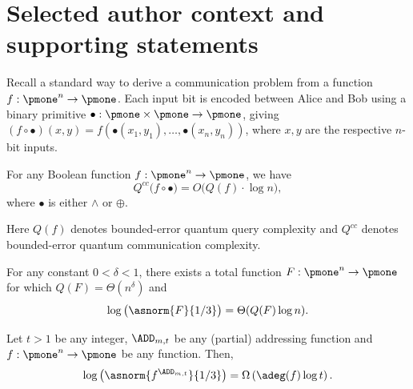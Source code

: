 \section*{Selected author context and supporting statements}
Recall a standard way to derive a communication problem from a function $f:\pmone^n\to\pmone$. Each input bit is encoded between Alice and Bob using a binary primitive $\bullet:\pmone\times\pmone\to\pmone$, giving $(f\circ\bullet)(x,y)=f(\bullet(x_1,y_1),\ldots,\bullet(x_n,y_n))$, where $x,y$ are the respective $n$-bit inputs.
\setcounter{theorem}{0}
\begin{theorem}\label{thm: qtm_sim_log_loss}
For any Boolean function $f : \pmone^n \to \pmone$, we have 
\[
Q^{cc}\big(f \circ \bullet\big) = O\big(Q(f)\cdot \log n\big),
\]
where $\bullet$ is either $\wedge$ or $\oplus$.
\end{theorem}
Here $Q(f)$ denotes bounded-error quantum query complexity and $Q^{cc}$ denotes bounded-error quantum communication complexity.
\setcounter{theorem}{3}
\begin{theorem}\label{thm: wtdeg}
For any constant $0 < \delta < 1$, there exists a total function $F : \pmone^n \to \pmone$ for which $Q(F) = \Theta(n^{\delta})$ and 
\[
    \log\big( \asnorm{F}{1/3} \big)= \Theta(Q(F) \log n).
\]
\end{theorem}
\setcounter{theorem}{5}
\begin{lemma}\label{lem: lifting} \label{lemma:degree-norm-lifting}
Let $t > 1$ be any integer, $\ADD_{m,t}$ be any (partial) addressing function and $f : \pmone^n \to \pmone$ be any function. Then,
\[
   \log\left(\asnorm{f^{\ADD_{m,t}}}{1/3}\right) = \Omega\left(\adeg(f) \log t\right).
\]
\end{lemma}
